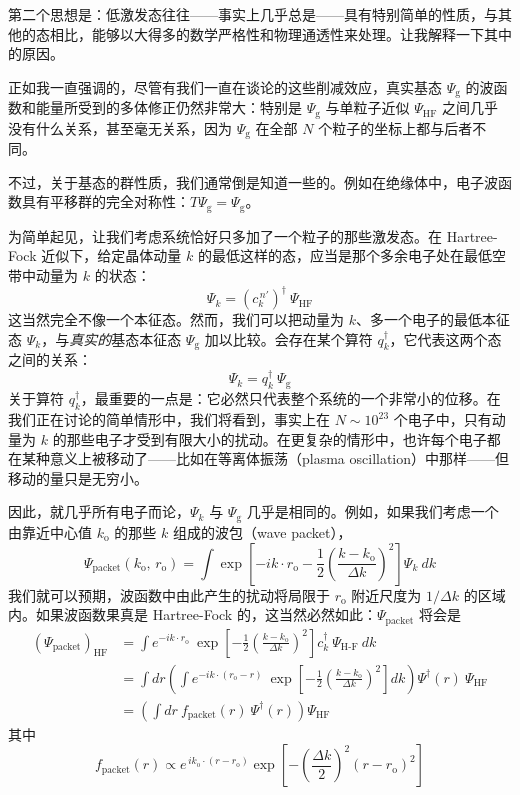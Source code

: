 第二个思想是：低激发态往往——事实上几乎总是——具有特别简单的性质，与其他的态相比，能够以大得多的数学严格性和物理通透性来处理。让我解释一下其中的原因。

正如我一直强调的，尽管有我们一直在谈论的这些削减效应，真实基态 $\Psi_{\mathrm{g}}$ 的波函数和能量所受到的多体修正仍然非常大：特别是 $\Psi_{\mathrm{g}}$ 与单粒子近似 $\Psi_{\mathrm{HF}}$ 之间几乎没有什么关系，甚至毫无关系，因为 $\Psi_{\mathrm{g}}$ 在全部 $N$ 个粒子的坐标上都与后者不同。

不过，关于基态的群性质，我们通常倒是知道一些的。例如在绝缘体中，电子波函数具有平移群的完全对称性：$T\Psi_{\mathrm{g}}=\Psi_{\mathrm{g}}$。

为简单起见，让我们考虑系统恰好只多加了一个粒子的那些激发态。在 Hartree-Fock 近似下，给定晶体动量 $k$ 的最低这样的态，应当是那个多余电子处在最低空带中动量为 $k$ 的状态：
\begin{equation*}
\Psi_{k}=\left(c^{\,n'}_{k}\right)^{\dagger}\ \Psi_{\mathrm{HF}}
\end{equation*}
这当然完全不像一个本征态。然而，我们可以把动量为 $k$、多一个电子的最低本征态 $\Psi_{k}$，与\emph{真实的}基态本征态 $\Psi_{\mathrm{g}}$ 加以比较。会存在某个算符 $q^{\dagger}_{k}$，它代表这两个态之间的关系：
\begin{equation*}
\Psi_{k}=q^{\dagger}_{k}\ \Psi_{\mathrm{g}}
\end{equation*}
关于算符 $q^{\dagger}_{k}$，最重要的一点是：它必然只代表整个系统的一个非常小的位移。在我们正在讨论的简单情形中，我们将看到，事实上在 $N\sim 10^{23}$ 个电子中，只有动量为 $k$ 的那些电子才受到有限大小的扰动。在更复杂的情形中，也许每个电子都在某种意义上被移动了——比如在等离体振荡（plasma oscillation）中那样——但移动的量只是无穷小。

因此，就几乎所有电子而论，$\Psi_{k}$ 与 $\Psi_{\mathrm{g}}$ 几乎是相同的。例如，如果我们考虑一个由靠近中心值 $k_{\mathrm{o}}$ 的那些 $k$ 组成的波包（wave packet），
\begin{equation*}
\Psi_{\text{packet}}(k_{\mathrm{o}},\,r_{\mathrm{o}})=\int\exp\left[-ik\cdot r_{\mathrm{o}}-\frac{1}{2}\left(\frac{k-k_{\mathrm{o}}}{\Delta k}\right)^{2}\right]\Psi_{k}\ dk
\end{equation*}
我们就可以预期，波函数中由此产生的扰动将局限于 $r_{\mathrm{o}}$ 附近尺度为 $1/\Delta k$ 的区域内。如果波函数果真是 Hartree-Fock 的，这当然必然如此：$\Psi_{\text{packet}}$ 将会是
\begin{align*}
\left(\Psi_{\text{packet}}\right)_{\mathrm{HF}}&=\int e^{-ik\cdot r_{\mathrm{o}}}\ \exp\left[-\frac{1}{2}\left(\frac{k-k_{\mathrm{o}}}{\Delta k}\right)^{2}\right]c^{\dagger}_{k}\ \Psi_{\text{H-F}}\ dk\\
&=\int dr\left(\int e^{-ik\cdot(r_{\mathrm{o}}-r)}\ \exp\left[-\frac{1}{2}\left(\frac{k-k_{\mathrm{o}}}{\Delta k}\right)^{2}\right]dk\right)\Psi^{\dagger}(r)\ \Psi_{\mathrm{HF}}\\
&=\left(\int dr\ f_{\text{packet}}(r)\ \Psi^{\dagger}(r)\right)\Psi_{\mathrm{HF}}
\end{align*}
其中
\begin{equation*}
f_{\text{packet}}(r)\propto e^{\,ik_{\mathrm{o}}\cdot(r-r_{\mathrm{o}})}\exp\left[-\left(\frac{\Delta k}{2}\right)^{2}(r-r_{\mathrm{o}})^{2}\right]
\end{equation*}

